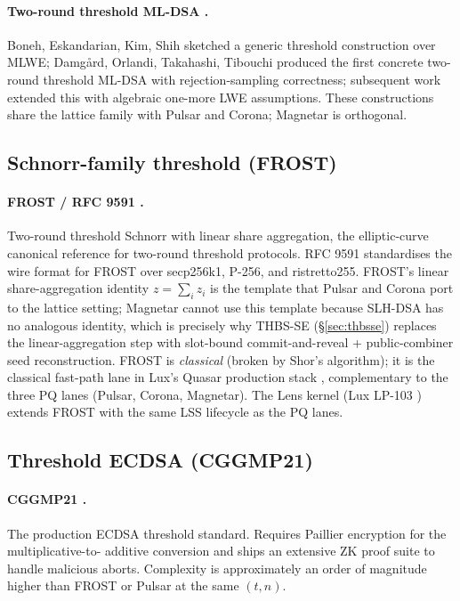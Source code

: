 \paragraph{Two-round threshold ML-DSA \cite{boneh2018,damgard2021,
dttf2024}.} Boneh, Eskandarian, Kim, Shih sketched a generic
threshold construction over MLWE; Damg{\aa}rd, Orlandi, Takahashi,
Tibouchi produced the first concrete two-round threshold ML-DSA
with rejection-sampling correctness; subsequent work
\cite{dttf2024} extended this with algebraic one-more LWE
assumptions. These constructions share the lattice family with
Pulsar and Corona; Magnetar is orthogonal.

\subsection{Schnorr-family threshold (FROST)}
\label{sec:related:schnorr}

\paragraph{FROST / RFC 9591 \cite{frost,rfc9591,komlogoldberg20}.}
Two-round threshold Schnorr with linear share aggregation, the
elliptic-curve canonical reference for two-round threshold
protocols. RFC 9591 standardises the wire format for FROST over
secp256k1, P-256, and ristretto255. FROST's linear share-aggregation
identity $z = \sum_i z_i$ is the
template that Pulsar and Corona port to the lattice setting;
Magnetar cannot use this template because SLH-DSA has no analogous
identity, which is precisely why THBS-SE
(\S\ref{sec:thbsse}) replaces the linear-aggregation step with
slot-bound commit-and-reveal + public-combiner seed reconstruction.
FROST is \emph{classical} (broken by Shor's algorithm); it is the
classical fast-path lane in Lux's Quasar production stack
\cite{lp020}, complementary to the three PQ lanes (Pulsar, Corona,
Magnetar). The Lens kernel (Lux LP-103 \cite{lp103}) extends FROST
with the same LSS lifecycle as the PQ lanes.

\subsection{Threshold ECDSA (CGGMP21)}
\label{sec:related:cggmp}

\paragraph{CGGMP21 \cite{cggmp21}.} The production ECDSA threshold
standard. Requires Paillier encryption for the multiplicative-to-
additive conversion and ships an extensive ZK proof suite to
handle malicious aborts. Complexity is approximately an order of
magnitude higher than FROST or Pulsar at the same $(t, n)$.

